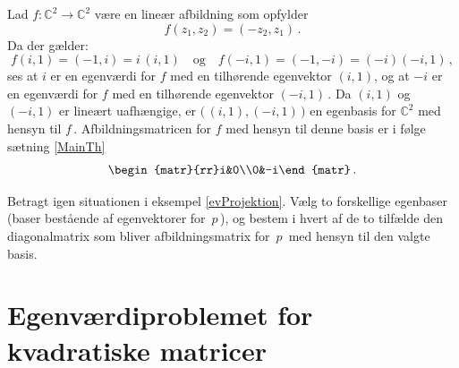 \begin{example}
Lad $f:\mathbb C^2 \rightarrow \mathbb C^2$ være en lineær afbildning som opfylder
\begin{equation*}f(z_1,z_2)=(-z_2,z_1)\,.\end{equation*}
Da der gælder:
$$ f(i,1)=(-1,i)=i\,(i,1)\quad \mathrm{og} \quad f(-i,1)=(-1,-i)=(- i)(-i,1)\,,$$
ses at $i$ er en egenværdi for $f$ med en tilhørende egenvektor $(i,1)$, og at $-i$ er en egenværdi for $f$ med en tilhørende egenvektor $(-i,1)\,.$\bs
Da $(i,1)$ og $(-i,1)$ er lineært uafhængige, er $\big(\,(i,1),(-i,1)\,\big)$ en egenbasis for $\mathbb C^2$ med hensyn til $f\,.$ Afbildningsmatricen for $f$ med hensyn til denne basis er i følge sætning \ref{MainTh}
\begin{equation*}\begin{matr}{rr}i&0\\0&-i\end{matr}\,.\end{equation*}
\end{example}

\begin{exercise}\label{evProjektion2}
Betragt igen situationen i eksempel \ref{evProjektion}. Vælg to forskellige egenbaser (baser bestående af egenvektorer for $\,p\,$), og bestem i hvert af de to tilfælde den diagonalmatrix som bliver afbildningsmatrix for $\,p\,$ med hensyn til den valgte basis. 
\end{exercise}

%




\section{Egenværdiproblemet for kvadratiske matricer}

